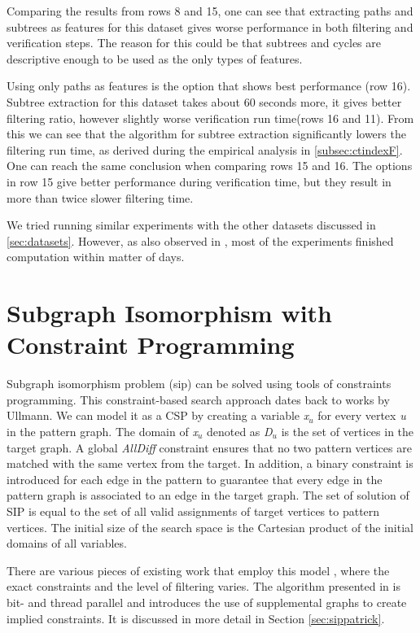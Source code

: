 \documentclass{l4proj}
\begin{document}
Comparing the results from rows 8 and 15, one can see that extracting paths and subtrees as features for this dataset gives worse performance in both filtering and verification steps. The reason for this could be that subtrees and cycles are descriptive enough to be used as the only types of features.

Using only paths as features is the option that shows best performance (row 16). Subtree extraction for this dataset takes about 60 seconds more, it gives better filtering ratio, however slightly worse verification run time(rows 16 and 11). From this we can see that the algorithm for subtree extraction significantly lowers the filtering run time, as derived during the empirical analysis in \ref{subsec:ctindexF}. One can reach the same conclusion when comparing rows 15 and 16. The options in row 15 give better performance during verification time, but they result in more than twice slower filtering time.

We tried running similar experiments with the other datasets discussed in \ref{sec:datasets}. However, as also observed in \cite{foteini}, most of the experiments finished computation within matter of days.


\section{Subgraph Isomorphism with Constraint Programming}
\label{sec:sipalgos}
Subgraph isomorphism problem (\gls{sip}) can be solved using tools of constraints programming. This constraint-based search approach dates back to works by Ullmann\cite{Ullmann:1976}. We can model it as a CSP by creating a variable \emph{x$_{u}$} for every vertex \emph{u} in the pattern graph. The domain of \emph{x$_{u}$} denoted as \emph{D$_{u}$} is the set of vertices in the target graph. A global \emph{AllDiff} constraint \cite{Regin:1994} ensures that no two pattern vertices are matched with the same vertex from the target. In addition, a binary constraint is introduced for each edge in the pattern to guarantee that every edge in the pattern graph is associated to an edge in the target graph. The set of solution of SIP is equal to the set of all valid assignments of target vertices to pattern vertices. The initial size of the search space is the Cartesian product of the initial domains of all variables. 

There are various pieces of existing work that employ this model \cite{Solnon:2010, Ullmann:1976, Regin:1995, Larrosa:2002, Solnon:2010a, CP2015}, where the exact constraints and the level of filtering varies. The algorithm presented in \cite{CP2015} is bit- and thread parallel and introduces the use of supplemental graphs to create implied constraints. It is discussed in more detail in Section \ref{sec:sippatrick}.%
\end{document}
